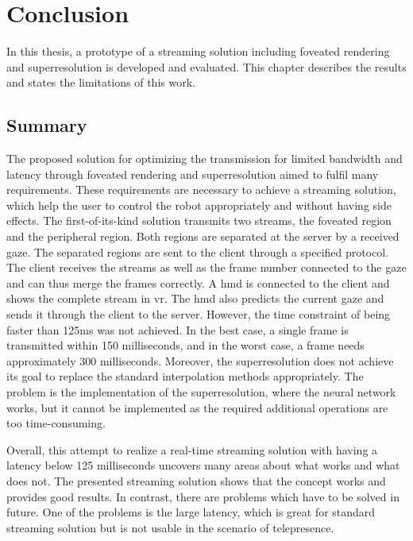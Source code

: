 \chapter{Conclusion}\label{chapter:conclusion}
In this thesis, a prototype of a streaming solution including foveated rendering and superresolution is developed and evaluated. This chapter describes the results and states the limitations of this work.
\section{Summary}
The proposed solution for optimizing the transmission for limited bandwidth and latency through foveated rendering and superresolution aimed to fulfil many requirements. These requirements are necessary to achieve a streaming solution, which help the user to control the robot appropriately and without having side effects. The first-of-its-kind solution transmits two streams, the foveated region and the peripheral region. Both regions are separated at the server by a received gaze. The separated regions are sent to the client through a specified protocol. The client receives the streams as well as the frame number connected to the gaze and can thus merge the frames correctly. A \gls{hmd} is connected to the client and shows the complete stream in \gls{vr}. The \gls{hmd} also predicts the current gaze and sends it through the client to the server. However, the time constraint of being faster than 125ms was not achieved. In the best case, a single frame is transmitted within 150 milliseconds, and in the worst case, a frame needs approximately 300 milliseconds. Moreover, the superresolution does not achieve its goal to replace the standard interpolation methods appropriately. The problem is the implementation of the superresolution, where the neural network works, but it cannot be implemented as the required additional operations are too time-consuming.
\par
Overall, this attempt to realize a real-time streaming solution with having a latency below 125 milliseconds uncovers many areas about what works and what does not. The presented streaming solution shows that the concept works and provides good results. In contrast, there are problems which have to be solved in future. One of the problems is the large latency, which is great for standard streaming solution but is not usable in the scenario of telepresence.

